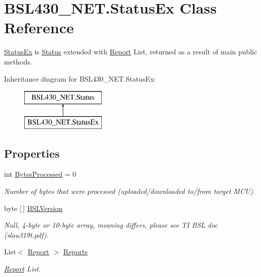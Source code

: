 \hypertarget{class_b_s_l430___n_e_t_1_1_status_ex}{}\section{B\+S\+L430\+\_\+\+N\+E\+T.\+Status\+Ex Class Reference}
\label{class_b_s_l430___n_e_t_1_1_status_ex}


\mbox{\hyperlink{class_b_s_l430___n_e_t_1_1_status_ex}{Status\+Ex}} is \mbox{\hyperlink{class_b_s_l430___n_e_t_1_1_status}{Status}} extended with \mbox{\hyperlink{class_b_s_l430___n_e_t_1_1_report}{Report}} List, returned as a result of main public methods.  


Inheritance diagram for B\+S\+L430\+\_\+\+N\+E\+T.\+Status\+Ex\+:\begin{figure}[H]
\begin{center}
\leavevmode
\includegraphics[height=2.000000cm]{class_b_s_l430___n_e_t_1_1_status_ex}
\end{center}
\end{figure}
\subsection*{Properties}
\begin{DoxyCompactItemize}
\item 
int \mbox{\hyperlink{class_b_s_l430___n_e_t_1_1_status_ex_ae5f74b0e3a46400e9b6b59f70ca43d21}{Bytes\+Processed}} = 0
\begin{DoxyCompactList}\small\item\em Number of bytes that were processed (uploaded/downloaded to/from target M\+CU). \end{DoxyCompactList}\item 
byte \mbox{[}$\,$\mbox{]} \mbox{\hyperlink{class_b_s_l430___n_e_t_1_1_status_ex_a1373af4a2572ec35a83b9d34f16308a6}{B\+S\+L\+Version}}
\begin{DoxyCompactList}\small\item\em Null, 4-\/byte or 10-\/byte array, meaning differs, please see TI B\+SL doc (slau319t.\+pdf). \end{DoxyCompactList}\item 
List$<$ \mbox{\hyperlink{class_b_s_l430___n_e_t_1_1_report}{Report}} $>$ \mbox{\hyperlink{class_b_s_l430___n_e_t_1_1_status_ex_aed3fe7eee33a1e3c254a79d5eabc00b9}{Reports}}
\begin{DoxyCompactList}\small\item\em \mbox{\hyperlink{class_b_s_l430___n_e_t_1_1_report}{Report}} List. \end{DoxyCompactList}\end{DoxyCompactItemize}


